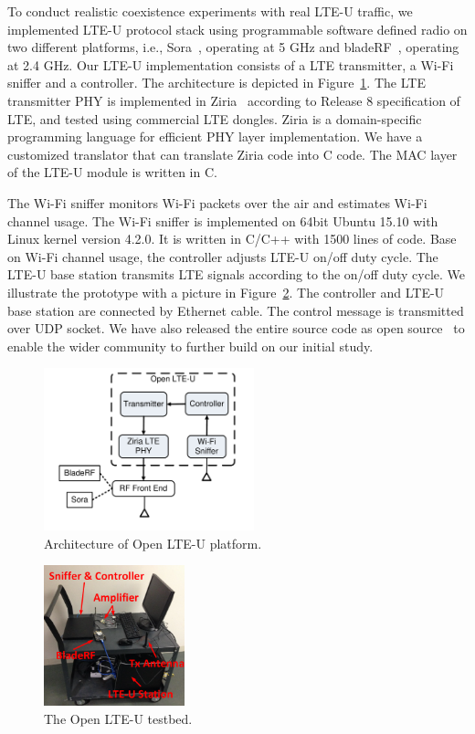 
To conduct realistic coexistence experiments with real LTE-U traffic, 
we implemented LTE-U protocol stack 
using programmable software defined radio on two different platforms, 
i.e., Sora~\cite{sora}, operating at 5 GHz and bladeRF~\cite{bladeRF}, operating at 2.4 GHz. 
Our LTE-U implementation consists of a LTE transmitter, a Wi-Fi sniffer and a controller.
The architecture is depicted in Figure~\ref{fig:platform}.
The LTE transmitter PHY is implemented in Ziria~\cite{stewart2015ziria} according to Release 8 specification of LTE, and tested using commercial LTE dongles. 
Ziria is a domain-specific programming language for efficient PHY layer implementation.  
We have a customized translator that 
can translate Ziria code into C code.
The MAC layer of the LTE-U module is written in C. 


The Wi-Fi sniffer monitors Wi-Fi packets over the air and estimates Wi-Fi channel usage.
The Wi-Fi sniffer is implemented on 64bit Ubuntu 15.10
with Linux kernel version 4.2.0. 
It is written in C/C++ with 1500 lines of code. 
Base on Wi-Fi channel usage, the controller adjusts LTE-U on/off duty cycle. 
The LTE-U base station transmits LTE signals according to the on/off duty cycle. 
We illustrate the prototype with a picture in Figure~\ref{fig:testbed}.
The controller and LTE-U base station are connected by
Ethernet cable. 
The control message is transmitted over UDP socket. 
We have also released the entire source code as open source~\cite{OpenLTEU} to enable the wider community to further build on our initial study.



\begin{figure}[!htb]
 \centering
     \includegraphics[width=2.4in]{./figures/architecture}
     \vspace{0.0cm}
     \caption{Architecture of Open LTE-U platform.}
   \label{fig:platform}
\end{figure}

\begin{figure}[!htb]
 \centering
     \includegraphics[width=1.6in]{./figures/testbed.png}
  \caption{The Open LTE-U testbed.}
   \label{fig:testbed}
\end{figure}


